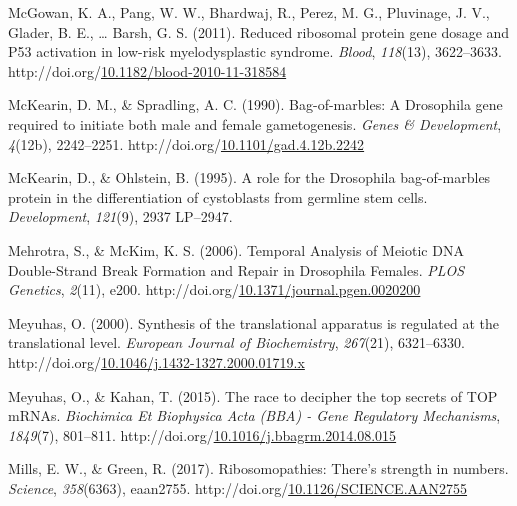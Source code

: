 \documentclass[12pt,oneside]{reedthesis}
\newlength{\cslhangindent}
\newenvironment{CSLReferences}[2] %
 {%
  \setlength{\parindent}{0pt}
  \ifodd #1 \everypar{\setlength{\hangindent}{\cslhangindent}}\ignorespaces\fi
  \ifnum #2 > 0
  \setlength{\parskip}{#2\baselineskip}
  \fi
 }%
 {}
\begin{document}
\begin{CSLReferences}{1}{0}
\leavevmode{}%
McGowan, K. A., Pang, W. W., Bhardwaj, R., Perez, M. G., Pluvinage, J. V., Glader, B. E., \ldots{} Barsh, G. S. (2011). Reduced ribosomal protein gene dosage and P53 activation in low-risk myelodysplastic syndrome. \emph{Blood}, \emph{118}(13), 3622--3633. http://doi.org/\href{https://doi.org/10.1182/blood-2010-11-318584}{10.1182/blood-2010-11-318584}

\leavevmode{}%
McKearin, D. M., \& Spradling, A. C. (1990). Bag-of-marbles: A {Drosophila} gene required to initiate both male and female gametogenesis. \emph{Genes \& Development}, \emph{4}(12b), 2242--2251. http://doi.org/\href{https://doi.org/10.1101/gad.4.12b.2242}{10.1101/gad.4.12b.2242}

\leavevmode{}%
McKearin, D., \& Ohlstein, B. (1995). A role for the {Drosophila} bag-of-marbles protein in the differentiation of cystoblasts from germline stem cells. \emph{Development}, \emph{121}(9), 2937 LP--2947.

\leavevmode{}%
Mehrotra, S., \& McKim, K. S. (2006). Temporal {Analysis} of {Meiotic DNA Double-Strand Break Formation} and {Repair} in {Drosophila Females}. \emph{PLOS Genetics}, \emph{2}(11), e200. http://doi.org/\href{https://doi.org/10.1371/journal.pgen.0020200}{10.1371/journal.pgen.0020200}

\leavevmode{}%
Meyuhas, O. (2000). Synthesis of the translational apparatus is regulated at the translational level. \emph{European Journal of Biochemistry}, \emph{267}(21), 6321--6330. http://doi.org/\href{https://doi.org/10.1046/j.1432-1327.2000.01719.x}{10.1046/j.1432-1327.2000.01719.x}

\leavevmode{}%
Meyuhas, O., \& Kahan, T. (2015). The race to decipher the top secrets of {TOP mRNAs}. \emph{Biochimica Et Biophysica Acta (BBA) - Gene Regulatory Mechanisms}, \emph{1849}(7), 801--811. http://doi.org/\href{https://doi.org/10.1016/j.bbagrm.2014.08.015}{10.1016/j.bbagrm.2014.08.015}

\leavevmode{}%
Mills, E. W., \& Green, R. (2017). Ribosomopathies: {There}'s strength in numbers. \emph{Science}, \emph{358}(6363), eaan2755. http://doi.org/\href{https://doi.org/10.1126/SCIENCE.AAN2755}{10.1126/SCIENCE.AAN2755}


\end{CSLReferences}
\end{document}
